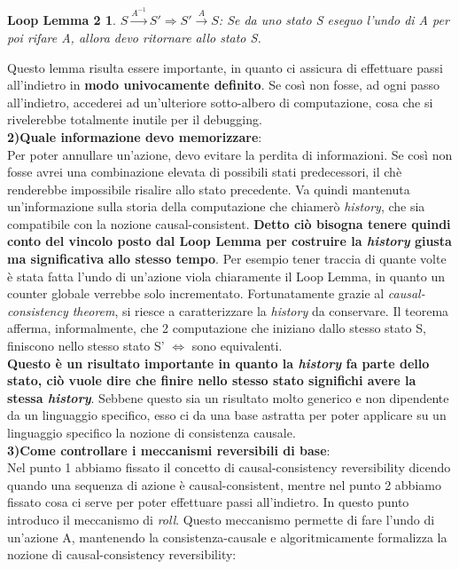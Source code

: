\documentclass[background.tex]{subfiles}
\begin{document}
\newtheorem*{ax2}{Loop Lemma 2}
	\begin{ax2}
 		$\displaystyle S\xrightarrow{A^{-1}}S' \Rightarrow S'\xrightarrow{A}S$: Se da uno stato S eseguo l'undo di A per poi rifare A, allora devo ritornare allo stato S.
	\end{ax2}
Questo lemma risulta essere importante, in quanto ci assicura di effettuare passi all'indietro in \textbf{modo univocamente definito}. Se così non fosse, ad ogni passo all'indietro, accederei ad un'ulteriore sotto-albero di computazione, cosa che si rivelerebbe totalmente inutile per il debugging.\\
\textbf{2)Quale informazione devo memorizzare}:\\
Per poter annullare un'azione, devo evitare la perdita di informazioni. Se così non fosse avrei una combinazione elevata di possibili stati predecessori, il chè renderebbe impossibile risalire allo stato precedente.
Va quindi mantenuta un'informazione sulla storia della computazione che chiamerò \textit{history}, che sia compatibile con la nozione causal-consistent.
\textbf{Detto ciò bisogna tenere quindi conto del vincolo posto dal Loop Lemma per costruire la \textit{history} giusta ma significativa allo stesso tempo}. Per esempio tener traccia di quante volte è stata fatta l'undo di un'azione viola chiaramente il Loop Lemma, in quanto un counter globale verrebbe solo incrementato. Fortunatamente grazie al \textit{causal-consistency theorem}\cite{causal}, si riesce a caratterizzare la \textit{history} da conservare.
Il teorema afferma, informalmente, che 2 computazione che iniziano dallo stesso stato S, finiscono nello stesso stato S' $\iff$ sono equivalenti.\\
\textbf{Questo è un risultato importante in quanto la \textit{history} fa parte dello stato, ciò vuole dire che finire nello stesso stato significhi avere la stessa \textit{history}}.
Sebbene questo sia un risultato molto generico e non dipendente da un linguaggio specifico, esso ci da una base astratta per poter applicare su un linguaggio specifico la nozione di consistenza causale.\\
\textbf{3)Come controllare i meccanismi reversibili di base}:\\
Nel punto 1 abbiamo fissato il concetto di causal-consistency reversibility dicendo quando una sequenza di azione è causal-consistent, mentre nel punto 2 abbiamo fissato cosa ci serve per poter effettuare passi all'indietro. In questo punto introduco il meccanismo di \textit{roll}.
Questo meccanismo permette di fare l'undo di un'azione A, mantenendo la consistenza-causale e algoritmicamente formalizza la nozione di causal-consistency reversibility:\\
\end{document}
